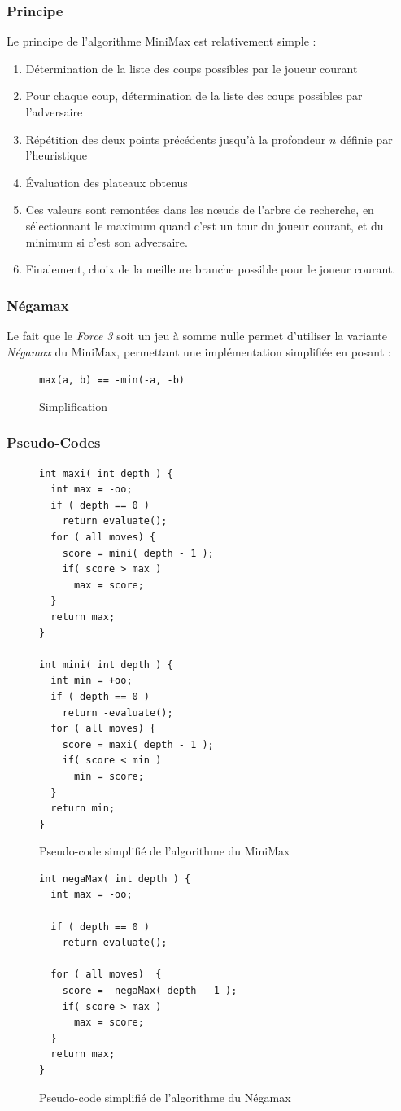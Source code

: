 \documentclass[a4paper,12pt]{article}
\newcommand{\code}[1]{\texttt{#1}}
\begin{document}
\subsubsection{Principe}
Le principe de l'algorithme MiniMax est relativement simple :
\begin{enumerate}
\item Détermination de la liste des coups possibles par le joueur courant
\item Pour chaque coup, détermination de la liste des coups
      possibles par l'adversaire
\item Répétition des deux points précédents jusqu'à la profondeur $n$ définie par l'heuristique 
\item Évaluation des plateaux obtenus
\item Ces valeurs sont remontées dans les n\oe{}uds de l'arbre de recherche,
    en sélectionnant le maximum quand c'est un tour du joueur courant,
    et du minimum si c'est son adversaire.
\item Finalement, choix de la meilleure branche possible pour le joueur courant.
\end{enumerate}

\subsubsection{Négamax}
Le fait que le \emph{Force 3} soit un jeu à somme nulle permet d'utiliser la variante \emph{Négamax} du MiniMax, permettant une implémentation simplifiée en posant :

\begin{figure}[H]
\code{max(a, b) == -min(-a, -b)}
\centering
\caption{Simplification}
\end{figure}
  
\subsubsection{Pseudo-Codes}
\begin{figure}[H]
\centering
\begin{lstlisting}
int maxi( int depth ) {
  int max = -oo;
  if ( depth == 0 )
    return evaluate();
  for ( all moves) {
    score = mini( depth - 1 );
    if( score > max )
      max = score;
  }
  return max;
}
 
int mini( int depth ) {
  int min = +oo;
  if ( depth == 0 )
    return -evaluate();
  for ( all moves) {
    score = maxi( depth - 1 );
    if( score < min )
      min = score;
  }
  return min;
}
\end{lstlisting}
\caption{Pseudo-code simplifié de l'algorithme du MiniMax}
\end{figure}
\begin{figure}[H]
\centering
\begin{lstlisting}
int negaMax( int depth ) {
  int max = -oo;
  
  if ( depth == 0 )
    return evaluate();
    
  for ( all moves)  {
    score = -negaMax( depth - 1 );
    if( score > max )
      max = score;
  }
  return max;
}
\end{lstlisting}
\caption{Pseudo-code simplifié de l'algorithme du Négamax}
\end{figure}
  
\end{document}
